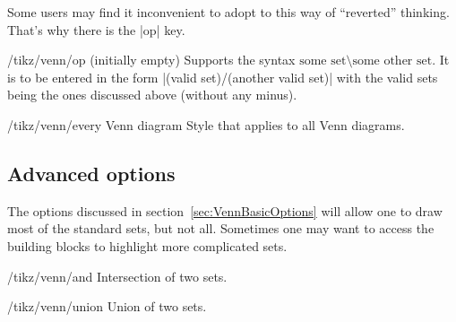 \documentclass[a4paper]{ltxdoc}
\begin{document}
Some users may find it inconvenient to adopt to this way of ``reverted'' thinking. That's why
there is the |op| key. 

\begin{key}{/tikz/venn/op (initially empty)}
        Supports the syntax $\mbox{some set}\setminus\mbox{some other set}$. It
		is to be entered in the form |(valid set)/(another valid set)| with the
		valid sets being the ones discussed above (without any minus).
\end{key}

\begin{codeexample}[width=5cm]
\end{codeexample}

\begin{codeexample}[width=5cm]
\end{codeexample}

\begin{key}{/tikz/venn/every Venn diagram }
        Style that applies to all Venn diagrams. 
\end{key}

\subsection{Advanced options}
\label{sec:VennAdvancedOptions}

The options discussed in section~\ref{sec:VennBasicOptions} will allow one to
draw most of the standard sets, but not all. Sometimes one may want to access
the building blocks to highlight more complicated sets. 

\begin{key}{/tikz/venn/and }
        Intersection of two sets. 
\end{key}

\begin{codeexample}[width=5cm]
\end{codeexample}

\begin{key}{/tikz/venn/union }
        Union of two sets. 
\end{key}
\end{document}
